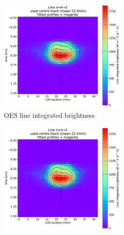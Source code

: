 \begin{figure}[!ht]
     \centering
     \begin{subfigure}{0.8\linewidth}
         \centering
         \includegraphics[width=0.7\textwidth,trim={20 170 550 300},clip]{Chapters/chapter3/figs/line_integrted_profile4.png}
         \caption{OES line integrated brightness}
         \label{fig:sampling4a}
     \end{subfigure}
     \begin{subfigure}{0.14\linewidth}
         \vspace*{-10mm}
         \hspace*{-20mm}
         \includegraphics[width=0.7\textwidth,trim={2200 0 0 40},clip]{Chapters/chapter3/figs/line_integrted_profile4.png}

\end{subfigure}
\end{figure}
